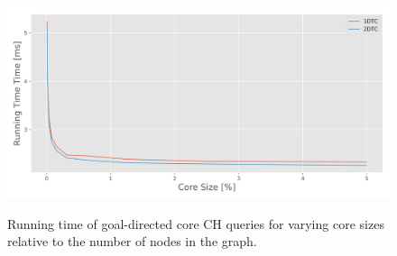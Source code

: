 \begin{figure}[hbtp]
	\centering
	\includegraphics[width=.95\textwidth]{plots/thesis_core_sizes-csp-parking_europe_hgv-time_ms.png}
	\label{fig:query_time_core_ch_sizes}
	\caption{Running time of goal-directed core CH queries for varying core sizes relative to the number of nodes in the graph.}
\end{figure}
